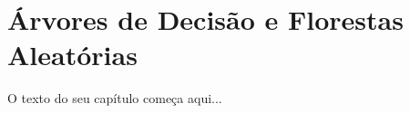
\chapter{Árvores de Decisão e Florestas Aleatórias}
\label{cap:arvores}

O texto do seu capítulo começa aqui...